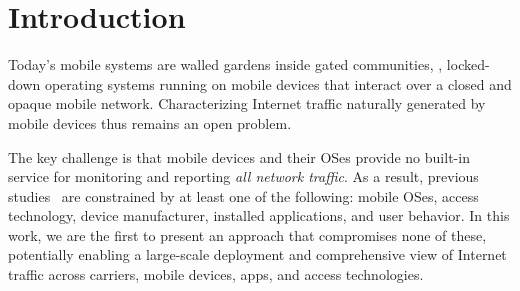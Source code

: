 \section{Introduction}
\label{sec:introduction}

Today's mobile systems are walled gardens inside gated communities, \ie{}, locked-down operating systems running on mobile devices that interact over a closed and opaque mobile network. 
Characterizing Internet traffic naturally generated by mobile devices thus remains an open problem. 

The key challenge is that mobile devices and their OSes provide no built-in service for monitoring and reporting \emph{all network traffic}. 
As a result, previous studies~\cite{vallina-rod:ads,gerber:passivespeed,chen:wifi,enck:taintdroid,wang:middleboxes,sommers:cellwifi} are constrained by at least one of the following: mobile OSes, access technology, device manufacturer, installed applications, and user behavior. 
In this work, we are the first to present an approach that compromises none of these, potentially enabling a large-scale 
deployment and comprehensive view of Internet traffic across carriers, mobile devices, 
apps, and access technologies.


